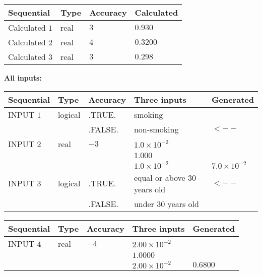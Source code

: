 \documentclass[12pt]{article}
\begin{document}
   
   
   
\noindent{}
   
   
  
  
\noindent\begin{tabular}{|l|l|l|l|}
\hline
 Sequential & Type & Accuracy & Calculated \\ 
\hline
 
 
  Calculated $            1 $ & real & $            3  $ & 
 $ 0.930 $ 
 \\  \hline  
 
 
  Calculated $            2 $ & real & $            4  $ & 
 $ 0.3200 $ 
 \\  \hline  
 
 
  Calculated $            3 $ & real & $            3  $ & 
 $ 0.298 $ 
 \\  \hline  
 \end{tabular}
   
   
   
   
\noindent\vspace{0.1in}\hspace{-0.08in} {\textbf{\Large{All inputs: }}}
   
   
  
  
\noindent\begin{tabular}{|l|l|l|l|l|}
\hline
 Sequential & Type & Accuracy & Three inputs & Generated \\ 
\hline
 
 
  INPUT $            1 $ & logical & .TRUE. & 
 smoking & 
  \\
  & & .FALSE. & 
  non-smoking & 
  $ <-- $ 
 \\  \hline  
 
 
  INPUT $            2 $ & real & $           -3  $ & $
 1.0 \times 10^{-2}
  $ & \\
  & & &  $
 1.000
  $ & \\
  & & &  $
 1.0 \times 10^{-2}
 $ & $ 7.0 \times 10^{-2} $ 
 \\  \hline  
 
 
  INPUT $            3 $ & logical & .TRUE. & 
 equal or above 30 years old & 
  $ <-- $ 
  \\
  & & .FALSE. & 
  under 30 years old & 
 \\  \hline  
 \end{tabular}
   
   
  
  
\noindent\begin{tabular}{|l|l|l|l|l|}
\hline
 Sequential & Type & Accuracy & Three inputs & Generated \\ 
\hline
 
 
  INPUT $            4 $ & real & $           -4  $ & $
 2.00 \times 10^{-2}
  $ & \\
  & & &  $
 1.0000
  $ & \\
  & & &  $
 2.00 \times 10^{-2}
 $ & $ 0.6800 $ 
 \\  \hline  
 \end{tabular}
   
\end{document}
